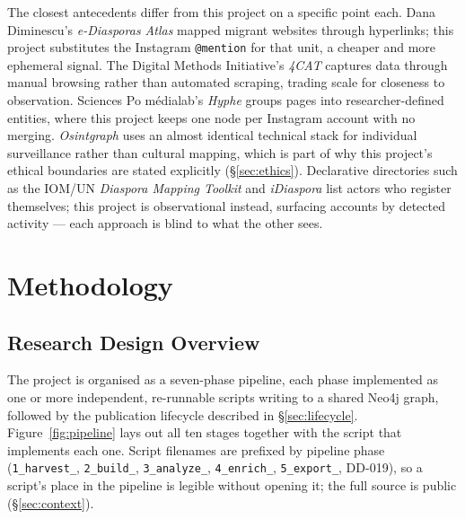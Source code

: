 \documentclass[12pt, a4paper]{report}
\begin{document}
The closest antecedents differ from this project on a specific point
each. Dana Diminescu's \emph{e-Diasporas Atlas}
\citep{diminescu2012,ediasporas} mapped migrant websites through
hyperlinks; this project substitutes the Instagram \texttt{@mention} for
that unit, a cheaper and more ephemeral signal. The Digital Methods
Initiative's \emph{4CAT} \citep{peeters2022,zeeschuimer} captures data
through manual browsing rather than automated scraping, trading scale for
closeness to observation. Sciences Po médialab's \emph{Hyphe}
\citep{jacomy2016hyphe} groups pages into researcher-defined entities,
where this project keeps one node per Instagram account with no merging.
\emph{Osintgraph} \citep{osintgraph} uses an almost identical technical
stack for individual surveillance rather than cultural mapping, which is
part of why this project's ethical boundaries are stated explicitly
(\S\ref{sec:ethics}). Declarative directories such as the IOM/UN
\emph{Diaspora Mapping Toolkit} \citep{iom2022diaspora} and
\emph{iDiaspora} \citep{idiaspora} list actors who register themselves;
this project is observational instead, surfacing accounts by detected
activity — each approach is blind to what the other sees.


\chapter{Methodology}
\label{ch:methodology}
\section{Research Design Overview}
\label{sec:research-design}

The project is organised as a seven-phase pipeline, each phase
implemented as one or more independent, re-runnable scripts writing to a
shared Neo4j graph, followed by the publication lifecycle described in
\S\ref{sec:lifecycle}. Figure~\ref{fig:pipeline} lays out all ten
stages together with the script that implements each one. Script
filenames are prefixed by pipeline phase (\texttt{1\_harvest\_},
\texttt{2\_build\_}, \texttt{3\_analyze\_}, \texttt{4\_enrich\_},
\texttt{5\_export\_}, DD-019), so a script's place in the pipeline is
legible without opening it; the full source is public
(\S\ref{sec:context}).
\end{document}
